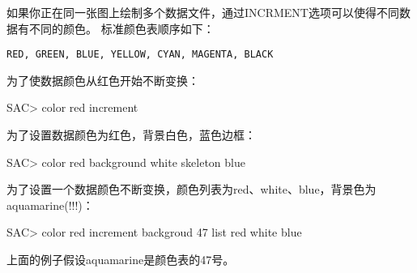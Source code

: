 如果你正在同一张图上绘制多个数据文件，通过INCRMENT选项可以使得不同数据有不同的颜色。
标准颜色表顺序如下：
\begin{verbatim}
RED, GREEN, BLUE, YELLOW, CYAN, MAGENTA, BLACK
\end{verbatim}

为了使数据颜色从红色开始不断变换：
\begin{SACCode}
SAC> color red increment
\end{SACCode}

为了设置数据颜色为红色，背景白色，蓝色边框：
\begin{SACCode}
SAC> color red background white skeleton blue
\end{SACCode}

为了设置一个数据颜色不断变换，颜色列表为red、white、blue，背景色为aquamarine(!!!)：
\begin{SACCode}
SAC> color red increment backgroud 47 list red white blue
\end{SACCode}
上面的例子假设aquamarine是颜色表的47号。
